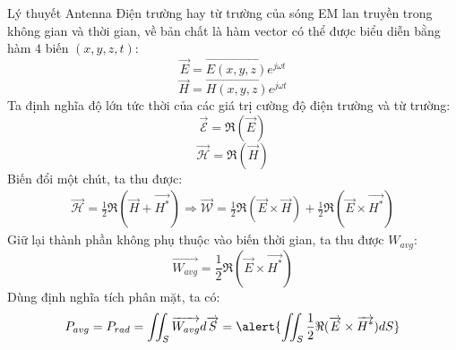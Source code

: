 \documentclass[8pt]{beamer}
\begin{document}
\begin{frame}{Lý thuyết Antenna}
Điện trường hay từ trường của sóng EM lan truyền trong không gian và thời gian, về bản chất là hàm vector có thể được biểu diễn bằng hàm $4$ biến $(x,y,z,t)$:
$$\overrightarrow{E}=\overrightarrow{E(x,y,z)}e^{j\omega t}$$
$$\overrightarrow{H}=\overrightarrow{H(x,y,z)}e^{j\omega t}$$
Ta định nghĩa độ lớn tức thời của các giá trị cường độ điện trường và từ trường:
$$\overrightarrow{\mathscr{E}}=\Re{(\overrightarrow{E})}$$
$$\overrightarrow{\mathscr{H}}=\Re{(\overrightarrow{H})}$$
Biến đổi một chút, ta thu được:
\begin{equation*}
\begin{split}
	{\overrightarrow{\mathscr{H}}}=\frac{1}{2}\Re{(\overrightarrow{H}+\overrightarrow{H^*})}
	\Rightarrow \overrightarrow{\mathscr{W}}=\frac{1}{2}\Re{(\overrightarrow{E}\times\overrightarrow{H})}+\frac{1}{2}\Re{(\overrightarrow{E}\times\overrightarrow{H^*})}
\end{split}
\end{equation*}
Giữ lại thành phần không phụ thuộc vào biến thời gian, ta thu được $W_{avg}$:
$$\overrightarrow{W_{avg}}=\frac{1}{2}\Re{(\overrightarrow{E}\times\overrightarrow{H^*})}$$
Dùng định nghĩa tích phân mặt, ta có:
$$P_{avg}=P_{rad}=\iint_{S}\overrightarrow{W_{avg}}d\overrightarrow{S}=\alert{\iint_{S}\frac{1}{2}\Re{(\overrightarrow{E}\times\overrightarrow{H^*})}dS}$$
\end{frame}
\end{document}
